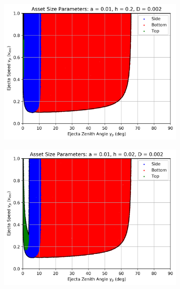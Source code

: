 \documentclass{article}
\begin{document}
\begin{figure}
	\begin{subfigure}[t]{.32\textwidth}
		\centering
		\includegraphics[width=.98\linewidth]{asset_speed_zenith_plot_1.010e+00_1.000e-02_2.000e-01_2.000e-03.png}  
		\label{fig:sub-asset_speed_zenith_h1_1}
	\end{subfigure}
	\begin{subfigure}[t]{.32\textwidth}
		\centering
		\includegraphics[width=.98\linewidth]{asset_speed_zenith_plot_1.010e+00_1.000e-02_2.000e-02_2.000e-03.png}  
		\label{fig:sub-asset_speed_zenith_h1_2}

\end{subfigure}
\end{figure}
\end{document}
